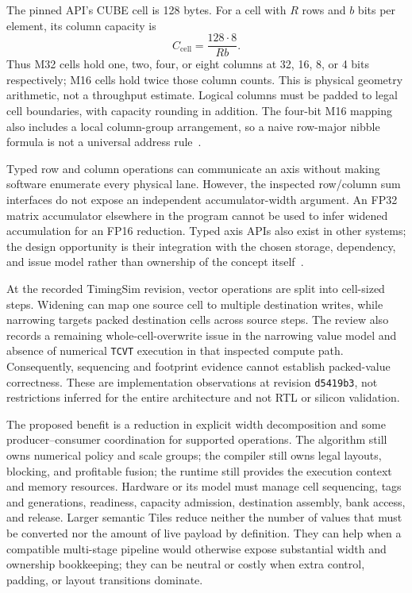 The pinned API's CUBE cell is 128 bytes. For a cell with $R$ rows and $b$ bits per element, its column capacity is
\begin{equation}
 C_{\mathrm{cell}}=\frac{128\cdot8}{Rb}.
 \label{eq:u003_cell_geometry}
\end{equation}
Thus M32 cells hold one, two, four, or eight columns at 32, 16, 8, or 4 bits respectively; M16 cells hold twice those column counts. This is physical geometry arithmetic, not a throughput estimate. Logical columns must be padded to legal cell boundaries, with capacity rounding in addition. The four-bit M16 mapping also includes a local column-group arrangement, so a naive row-major nibble formula is not a universal address rule~\citep{u003_linx_geometry}.

Typed row and column operations can communicate an axis without making software enumerate every physical lane. However, the inspected row/column sum interfaces do not expose an independent accumulator-width argument. An FP32 matrix accumulator elsewhere in the program cannot be used to infer widened accumulation for an FP16 reduction. Typed axis APIs also exist in other systems; the design opportunity is their integration with the chosen storage, dependency, and issue model rather than ownership of the concept itself~\citep{u003_linx_emit}.

At the recorded TimingSim revision, vector operations are split into cell-sized steps. Widening can map one source cell to multiple destination writes, while narrowing targets packed destination cells across source steps. The review also records a remaining whole-cell-overwrite issue in the narrowing value model and absence of numerical \texttt{TCVT} execution in that inspected compute path. Consequently, sequencing and footprint evidence cannot establish packed-value correctness. These are implementation observations at revision \texttt{d5419b3}, not restrictions inferred for the entire architecture and not RTL or silicon validation.

The proposed benefit is a reduction in explicit width decomposition and some producer--consumer coordination for supported operations. The algorithm still owns numerical policy and scale groups; the compiler still owns legal layouts, blocking, and profitable fusion; the runtime still provides the execution context and memory resources. Hardware or its model must manage cell sequencing, tags and generations, readiness, capacity admission, destination assembly, bank access, and release. Larger semantic Tiles reduce neither the number of values that must be converted nor the amount of live payload by definition. They can help when a compatible multi-stage pipeline would otherwise expose substantial width and ownership bookkeeping; they can be neutral or costly when extra control, padding, or layout transitions dominate.

